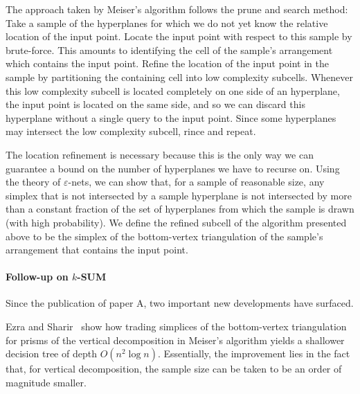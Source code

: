 The approach taken by Meiser's algorithm follows the prune and search method:
Take a sample of the hyperplanes for which we do not yet know the relative
location of the input point. Locate the input point with respect to this sample
by brute-force. This amounts to identifying the cell of the sample's arrangement
which contains the input point. Refine the location of the input point in the
sample by partitioning the containing cell into low complexity subcells. Whenever
this low complexity subcell is located completely on one side of an hyperplane,
the input point is located on the same side, and so we can discard this
hyperplane without a single query to the input point. Since some hyperplanes
may intersect the low complexity subcell, rince and repeat.

The location refinement is necessary because this is the only way we can
guarantee a bound on the number of hyperplanes we have to recurse on.
Using the theory of \(\varepsilon\)-nets, we can show that, for a sample of
reasonable size, any simplex that is not intersected by a sample hyperplane
is not intersected by more than a constant fraction of the set of
hyperplanes from which the sample is drawn (with high probability). We
define the refined subcell of the algorithm presented above to be the simplex
of the bottom-vertex triangulation of the sample's arrangement that contains
the input point.

\paragraph{Follow-up on \(k\)-SUM}
Since the publication of paper A, two important new developments have surfaced.

Ezra and Sharir~\cite{ES17} show how trading simplices of the bottom-vertex
triangulation for prisms of the vertical decomposition in Meiser's algorithm
yields a shallower decision tree of depth \(O(n^2 \log n)\). Essentially, the
improvement lies in the fact that, for vertical decomposition, the sample size
can be taken to be an order of magnitude smaller.



